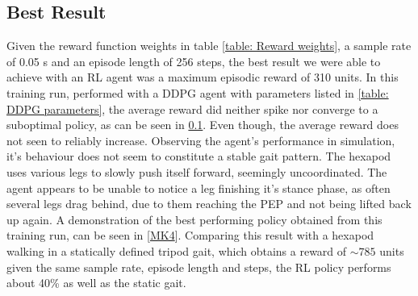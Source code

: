 \subsection{Best Result}
Given the reward function weights in table \ref{table: Reward weights}, a sample rate of 0.05 s and an episode length of 256 steps, the best result we were able to achieve with an RL agent was a maximum episodic reward of 310 units.
In this training run, performed with a DDPG agent with parameters listed in \ref{table: DDPG parameters}, the average reward did neither spike nor converge to a suboptimal policy, as can be seen in \ref{}.
Even though, the average reward does not seen to reliably increase.
Observing the agent's performance in simulation, it's behaviour does not seem to constitute a stable gait pattern.
The hexapod uses various legs to slowly push itself forward, seemingly uncoordinated.
The agent appears to be unable to notice a leg finishing it's stance phase, as often several legs drag behind, due to them reaching the PEP and not being lifted back up again.
A demonstration of the best performing policy obtained from this training run, can be seen in [\hyperref[vid: MK4]{MK4}].
Comparing this result with a hexapod walking in a statically defined tripod gait, which obtains a reward of $\sim785$ units given the same sample rate, episode length and steps, the RL policy performs about 40\% as well as the static gait.


